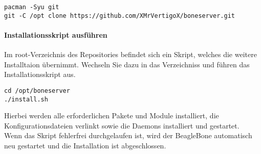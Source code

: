 \documentclass[manual.tex]{subfiles}
\begin{document}
\begin{lstlisting}
pacman -Syu git
git -C /opt clone https://github.com/XMrVertigoX/boneserver.git
\end{lstlisting}

\paragraph{Installationsskript ausführen} Im root-Verzeichnis des Repositories befindet sich ein Skript, welches die weitere Installtaion übernimmt. Wechseln Sie dazu in das Verzeichniss und führen das Installationsskript aus.

\begin{lstlisting}
cd /opt/boneserver
./install.sh
\end{lstlisting}

Hierbei werden alle erforderlichen Pakete und Module installiert, die Konfigurationsdateien verlinkt sowie die Daemons installiert und gestartet.\\

Wenn das Skript fehlerfrei durchgelaufen ist, wird der BeagleBone automatisch neu gestartet und die Installation ist abgeschlossen.
\end{document}
